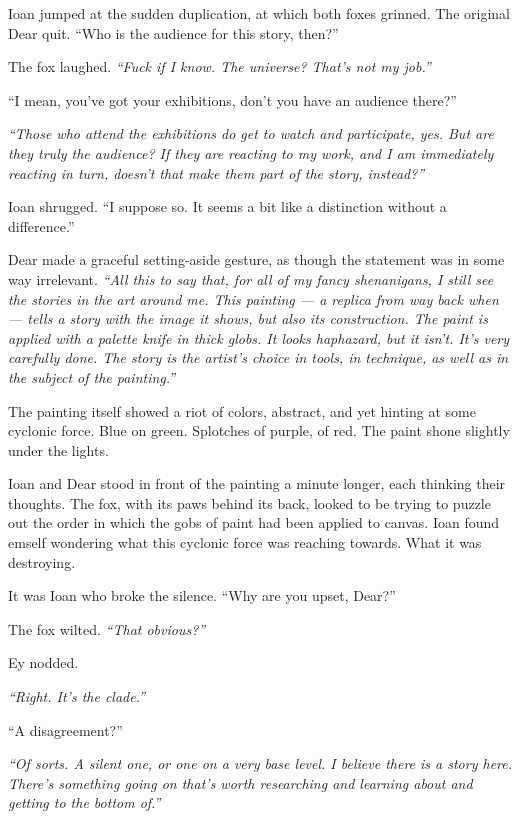 Ioan jumped at the sudden duplication, at which both foxes grinned. The original Dear quit. ``Who is the audience for this story, then?''

The fox laughed. \emph{``Fuck if I know. The universe? That's not my job.''}

``I mean, you've got your exhibitions, don't you have an audience there?''

\emph{``Those who attend the exhibitions do get to watch and participate, yes. But are they truly the audience? If they are reacting to my work, and I am immediately reacting in turn, doesn't that make them part of the story, instead?''}

Ioan shrugged. ``I suppose so. It seems a bit like a distinction without a difference.''

Dear made a graceful setting-aside gesture, as though the statement was in some way irrelevant. \emph{``All this to say that, for all of my fancy shenanigans, I still see the stories in the art around me. This painting --- a replica from way back when --- tells a story with the image it shows, but also its construction. The paint is applied with a palette knife in thick globs. It looks haphazard, but it isn't. It's very carefully done. The story is the artist's choice in tools, in technique, as well as in the subject of the painting.''}

The painting itself showed a riot of colors, abstract, and yet hinting at some cyclonic force. Blue on green. Splotches of purple, of red. The paint shone slightly under the lights.

Ioan and Dear stood in front of the painting a minute longer, each thinking their thoughts. The fox, with its paws behind its back, looked to be trying to puzzle out the order in which the gobs of paint had been applied to canvas. Ioan found emself wondering what this cyclonic force was reaching towards. What it was destroying.

It was Ioan who broke the silence. ``Why are you upset, Dear?''

The fox wilted. \emph{``That obvious?''}

Ey nodded.

\emph{``Right. It's the clade.''}

``A disagreement?''

\emph{``Of sorts. A silent one, or one on a very base level. I believe there is a story here. There's something going on that's worth researching and learning about and getting to the bottom of.''}

